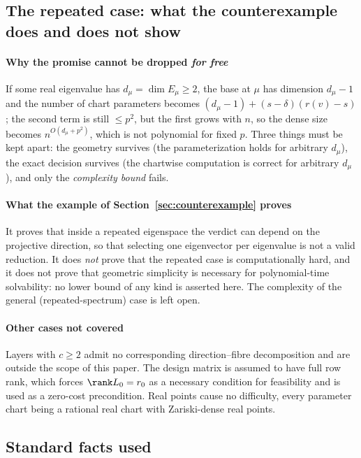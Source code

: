 \subsection{The repeated case: what the counterexample does and does not show}\label{sec5:sub:scope}

\paragraph{Why the promise cannot be dropped \emph{for free}} If some real eigenvalue has
$d_\mu=\dim E_\mu\ge2$, the base at $\mu$ has dimension $d_\mu-1$ and the number of chart parameters
becomes $(d_\mu-1)+(s-\delta)(r(v)-s)$; the second term is still $\le p^{2}$, but the first grows with
$n$, so the dense size becomes $n^{O(d_\mu+p^{2})}$, which is not polynomial for fixed $p$. Three
things must be kept apart: the geometry survives (the parameterization holds for arbitrary $d_\mu$),
the exact decision survives (the chartwise computation is correct for arbitrary $d_\mu$), and only the
\emph{complexity bound} fails.

\paragraph{What the example of Section~\ref{sec:counterexample} proves} It proves that inside a
repeated eigenspace the verdict can depend on the projective direction, so that selecting one
eigenvector per eigenvalue is not a valid reduction. It does \emph{not} prove that the repeated case is
computationally hard, and it does not prove that geometric simplicity is necessary for polynomial-time
solvability: no lower bound of any kind is asserted here. The complexity of the general
(repeated-spectrum) case is left open.

\paragraph{Other cases not covered} Layers with $c\ge2$ admit no corresponding direction--fibre
decomposition and are outside the scope of this paper. The design matrix is assumed to have full row
rank, which forces $\rank L_0=r_0$ as a necessary condition for feasibility and is used as a zero-cost
precondition. Real points cause no difficulty, every parameter chart being a rational real chart with
Zariski-dense real points.

\subsection{Standard facts used}\label{sec5:sub:facts}

